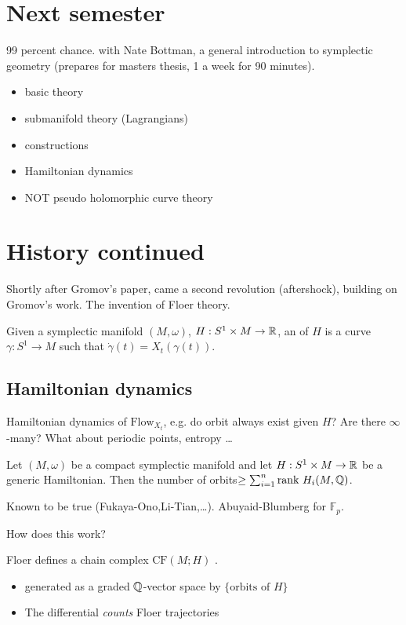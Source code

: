 \section{Next semester}

99 percent chance. with Nate Bottman, a general introduction to symplectic geometry (prepares for masters thesis, 1 a week for 90 minutes).
\begin{itemize}
    \item basic theory
    \item submanifold theory (Lagrangians) 
    \item constructions 
    \item Hamiltonian dynamics
    \item NOT pseudo holomorphic curve theory
\end{itemize}

\section{History continued}

Shortly after Gromov's paper, came a second revolution (aftershock), building on Gromov's work. The invention 
of Floer theory.

\begin{definition*}
    Given a symplectic manifold \((M,\omega)\), \(H:S^1\times M\to\mathbb{R}\), an  of 
    \(H\) is a curve \(\gamma:S^1\to M\) such that \(\dot{\gamma}(t)=X_t(\gamma(t))\).
\end{definition*}

\subsection{Hamiltonian dynamics}

Hamiltonian dynamics of \(\text{Flow}_{X_t}\), e.g. do orbit always exist given \(H\)? Are there \(\infty\)-many?
What about periodic points, entropy \dots 

 Let \((M,\omega)\) be a compact symplectic manifold  and let 
\(H:S^1\times M\to \mathbb{R}\) be a generic Hamiltonian. Then the number of orbits\(\geq \sum_{i=1}^n\text{rank }H_i(M,\mathbb{Q})\).

Known to be true (Fukaya-Ono,Li-Tian,\dots). Abuyaid-Blumberg for \(\mathbb{F}_p\). 

How does this work?

Floer defines a chain complex \(\text{CF}(M;H)\) . 
\begin{itemize}
    \item generated as a graded \(\mathbb{Q}\)-vector space by \(\{\text{orbits of } H\}\)
    \item The differential \textit{counts} Floer trajectories
\end{itemize}

